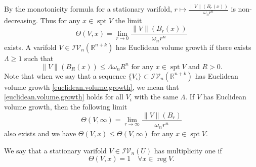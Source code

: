 \documentclass[11pt]{amsart}
\newtheorem{lemma}[theorem]{Lemma}
\theoremstyle{definition}
\newcommand{\R}{\mathbb{R}}
\newcommand{\C}{\mathcal{C}}
\newcommand{\IV}{\mathcal{IV}}
\newcommand{\loc}{\mathrm{loc}}
\DeclareMathOperator{\spt}{spt}
\DeclareMathOperator{\reg}{reg}
\begin{document}
By the monotonicity formula \cite[17.5]{Sim} for a stationary varifold, $r\mapsto \frac{\|V\|(B_r(x))}{\omega_nr^n}$ is non-decreasing. Thus for any $x\in \spt V$ the limit
\[\Theta(V,x)=\lim_{r\to0}\frac{\|V\|(B_r(x))}{\omega_nr^n}\]
exists. A varifold $V\in \IV_n(\R^{n+k})$ has Euclidean volume growth if there exists $\Lambda\ge 1$ such that 
\begin{equation}\label{euclidean.volume.growth}
	\|V\|(B_R(x))\le \Lambda \omega_n R^n\text{ for any }x\in \spt V\text{ and }R>0.
\end{equation}Note that when we say that a sequence $\{V_i\}\subset \IV_n(\R^{n+k})$ has Euclidean volume growth \eqref{euclidean.volume.growth}, we mean that \eqref{euclidean.volume.growth} holds for all $V_i$ with the same $\Lambda$.
If $V$ has Euclidean volume growth, then the following limit
\[\Theta(V,\infty)=\lim_{r\to\infty}\frac{\|V\|(B_r)}{\omega_nr^n}\] also exists
and we have $\Theta (V,x)\le \Theta(V,\infty)$ for any $x\in \spt V$.

We say that a stationary varifold $V\in \IV_n(U)$ has multiplicity one if
\begin{equation}\label{mult1}
	\Theta(V, x)=1\quad \forall x\in \reg V.
\end{equation}
\end{document}
